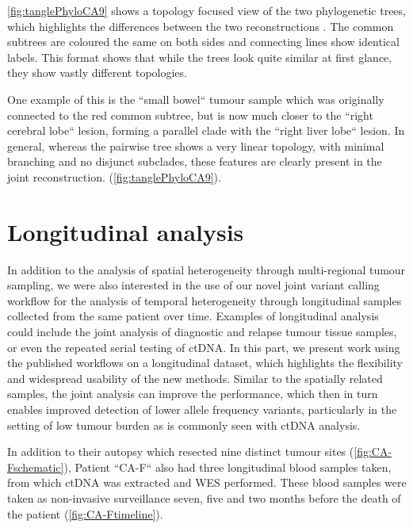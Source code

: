 \autoref{fig:tanglePhyloCA9} shows a topology focused view of the two phylogenetic trees, which highlights the differences between the two reconstructions \cite{Vienne2018}. The common subtrees are coloured the same on both sides and connecting lines show identical labels. This format shows that while the trees look quite similar at first glance, they show vastly different topologies.


One example of this is the ``small bowel`` tumour sample which was originally connected to the red common subtree, but is now much closer to the ``right cerebral lobe`` lesion, forming a parallel clade with the ``right liver lobe`` lesion. In general, whereas the pairwise tree shows a very linear topology, with minimal branching and no disjunct subclades, these features are clearly present in the joint reconstruction.  (\autoref{fig:tanglePhyloCA9}).


\section[Longitudinal analysis]{Longitudinal analysis}
\label{variantcalling-sec:longitudinal}

In addition to the analysis of spatial heterogeneity through multi-regional tu\-mour sam\-pling, we were also interested in the use of our novel joint variant calling workflow for the analysis of temporal heterogeneity through longitudinal samples collected from the same patient over time. Examples of longitudinal analysis could include the joint analysis of diagnostic and relapse tumour tissue samples, or even the repeated serial testing of ctDNA. In this part, we present work using the published workflows on a longitudinal dataset, which highlights the flexibility and widespread usability of the new methods. Similar to the spatially related samples, the joint analysis can improve the performance, which then in turn enables improved detection of lower allele frequency variants, particularly in the setting of low tumour burden as is commonly seen with ctDNA analysis.

In addition to their autopsy which resected nine distinct tumour sites (\autoref{fig:CA-Fschematic}), Patient ``CA-F`` also had three longitudinal blood samples taken, from which ctDNA was extracted and WES performed. These blood samples were taken as non-invasive surveillance seven, five and two months before the death of the patient (\autoref{fig:CA-Ftimeline}).

